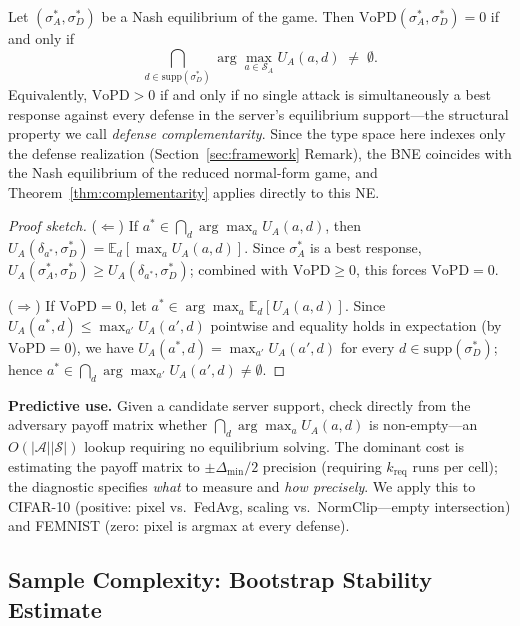 \documentclass{article}
\newcommand{\SA}{\mathcal{S}_A}
\newcommand{\UA}{U_A}
\begin{document}
\begin{theorem}
\label{thm:complementarity}
Let $(\sigma_A^*, \sigma_D^*)$ be a Nash equilibrium of the game. Then $\text{VoPD}(\sigma_A^*, \sigma_D^*) = 0$ if and only if
\begin{equation}
\bigcap_{d \in \mathrm{supp}(\sigma_D^*)} \arg\max_{a \in \SA} \UA(a, d) \;\neq\; \emptyset.
\label{eq:complementarity}
\end{equation}
Equivalently, $\text{VoPD} > 0$ if and only if no single attack is simultaneously a best response against every defense in the server's equilibrium support---the structural property we call \emph{defense complementarity}. Since the type space here indexes only the defense realization (Section~\ref{sec:framework} Remark), the BNE coincides with the Nash equilibrium of the reduced normal-form game, and Theorem~\ref{thm:complementarity} applies directly to this NE.
\end{theorem}
\begin{proof}[Proof sketch]
($\Leftarrow$) If $a^* \in \bigcap_{d} \arg\max_a \UA(a,d)$, then $\UA(\delta_{a^*}, \sigma_D^*) = \mathbb{E}_d[\max_a \UA(a,d)]$. Since $\sigma_A^*$ is a best response, $\UA(\sigma_A^*, \sigma_D^*) \geq \UA(\delta_{a^*}, \sigma_D^*)$; combined with $\text{VoPD} \geq 0$, this forces $\text{VoPD} = 0$.

($\Rightarrow$) If $\text{VoPD} = 0$, let $a^* \in \arg\max_a \mathbb{E}_d[\UA(a,d)]$. Since $\UA(a^*,d) \leq \max_{a'}\UA(a',d)$ pointwise and equality holds in expectation (by $\text{VoPD}=0$), we have $\UA(a^*,d) = \max_{a'}\UA(a',d)$ for every $d \in \mathrm{supp}(\sigma_D^*)$; hence $a^* \in \bigcap_d \arg\max_{a'}\UA(a',d) \neq \emptyset$.
\end{proof}

\textbf{Predictive use.} Given a candidate server support, check directly from the adversary payoff matrix whether $\bigcap_{d}\arg\max_a \UA(a,d)$ is non-empty---an $O(|\mathcal{A}||\mathcal{S}|)$ lookup requiring no equilibrium solving. The dominant cost is estimating the payoff matrix to $\pm\Delta_{\min}/2$ precision (requiring $k_{\text{req}}$ runs per cell); the diagnostic specifies \emph{what} to measure and \emph{how precisely}. We apply this to CIFAR-10 (positive: pixel vs.\ FedAvg, scaling vs.\ NormClip---empty intersection) and FEMNIST (zero: pixel is argmax at every defense).

\subsection{Sample Complexity: Bootstrap Stability Estimate}
\label{sec:sample_complexity}
\end{document}
